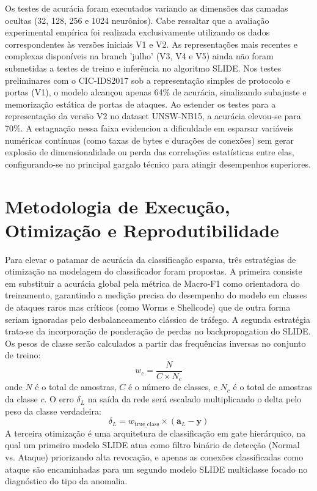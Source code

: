 \documentclass[11pt,a4paper,oneside]{article}
\begin{document}
Os testes de acurácia foram executados variando as dimensões das camadas ocultas (32, 128, 256 e 1024 neurônios). Cabe ressaltar que a avaliação experimental empírica foi realizada exclusivamente utilizando os dados correspondentes às versões iniciais V1 e V2. As representações mais recentes e complexas disponíveis na branch 'julho' (V3, V4 e V5) ainda não foram submetidas a testes de treino e inferência no algoritmo SLIDE. Nos testes preliminares com o CIC-IDS2017 sob a representação simples de protocolo e portas (V1), o modelo alcançou apenas 64\% de acurácia, sinalizando subajuste e memorização estática de portas de ataques. Ao estender os testes para a representação da versão V2 no dataset UNSW-NB15, a acurácia elevou-se para 70\%. A estagnação nessa faixa evidenciou a dificuldade em esparsar variáveis numéricas contínuas (como taxas de bytes e durações de conexões) sem gerar explosão de dimensionalidade ou perda das correlações estatísticas entre elas, configurando-se no principal gargalo técnico para atingir desempenhos superiores.

\section{Metodologia de Execução, Otimização e Reprodutibilidade} \label{sec:metodologia}
Para elevar o patamar de acurácia da classificação esparsa, três estratégias de otimização na modelagem do classificador foram propostas. A primeira consiste em substituir a acurácia global pela métrica de Macro-F1 como orientadora do treinamento, garantindo a medição precisa do desempenho do modelo em classes de ataques raros mas críticos (como Worms e Shellcode) que de outra forma seriam ignoradas pelo desbalanceamento clássico de tráfego. A segunda estratégia trata-se da incorporação de ponderação de perdas no backpropagation do SLIDE. Os pesos de classe serão calculados a partir das frequências inversas no conjunto de treino:
\begin{equation}
    w_c = \frac{N}{C \times N_c}
\end{equation}
onde $N$ é o total de amostras, $C$ é o número de classes, e $N_c$ é o total de amostras da classe $c$. O erro $\delta_L$ na saída da rede será escalado multiplicando o delta pelo peso da classe verdadeira:
\begin{equation}
    \delta_L = w_{\text{true\_class}} \times (\mathbf{a}_L - \mathbf{y})
\end{equation}
A terceira otimização é uma arquitetura de classificação em gate hierárquico, na qual um primeiro modelo SLIDE atua como filtro binário de detecção (Normal vs. Ataque) priorizando alta revocação, e apenas as conexões classificadas como ataque são encaminhadas para um segundo modelo SLIDE multiclasse focado no diagnóstico do tipo da anomalia.
\end{document}
